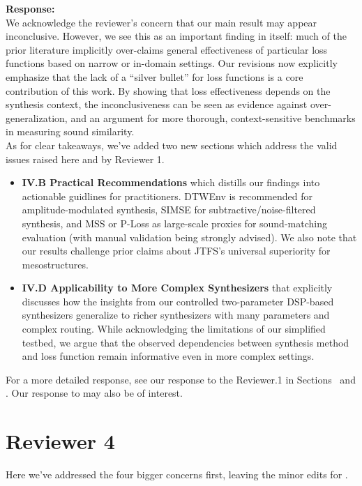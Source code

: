 \documentclass[11pt]{article}
\begin{document}
\noindent\textbf{Response:} \\

We acknowledge the reviewer’s concern that our main result may appear inconclusive. However, we see this as an important finding in itself: much of the prior literature implicitly over-claims general effectiveness of particular loss functions based on narrow or in-domain settings. Our revisions now explicitly emphasize that the lack of a “silver bullet” for loss functions is a core contribution of this work. By showing that loss effectiveness depends on the synthesis context, the inconclusiveness can be seen as evidence against over-generalization, and an argument for more thorough, context-sensitive benchmarks in measuring sound similarity.\\

As for clear takeaways, we've added two new sections which address the valid issues raised here and by Reviewer 1. 

\begin{itemize}
  \item \textbf{IV.B Practical Recommendations} which distills our findings into actionable guidlines for practitioners. DTWEnv is recommended for amplitude-modulated synthesis, SIMSE for subtractive/noise-filtered synthesis, and MSS or P-Loss as large-scale proxies for sound-matching evaluation (with manual validation being strongly advised). We also note that our results challenge prior claims about JTFS’s universal superiority for mesostructures.
  \item \textbf{IV.D Applicability to More Complex Synthesizers} that explicitly discusses how the insights from our controlled two-parameter DSP-based synthesizers generalize to richer synthesizers with many parameters and complex routing. While acknowledging the limitations of our simplified testbed, we argue that the observed dependencies between synthesis method and loss function remain informative even in more complex settings.
\end{itemize}
For a more detailed response, see our response to the Reviewer.1 in Sections~ and . Our response to  may also be of interest.


\section{Reviewer 4}
Here we've addressed the four bigger concerns first, leaving the minor edits for .
\end{document}
